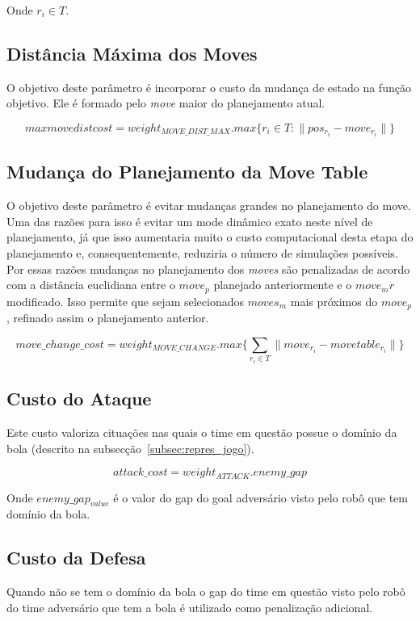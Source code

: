 Onde $r_i \in T$.

\subsection{Distância Máxima dos Moves} 
O objetivo deste parâmetro é incorporar o custo da
mudança de estado na função objetivo. Ele é formado pelo \textit{move}
maior do planejamento atual.

\begin{dmath} 
 max move dist cost = weight_{MOVE{\_}DIST{\_}MAX} . 
 max \lbrace r_i \in T : \lVert pos_{r_i} - move_{r_i}\rVert \rbrace
\end{dmath} 

\subsection{Mudança do Planejamento da Move Table}\label{subsec:change_cost}
O objetivo deste parâmetro é evitar mudanças grandes no
planejamento do move. Uma das razões para isso é evitar um mode dinâmico
exato neste nível de planejamento, já que isso aumentaria muito o custo
computacional desta etapa do planejamento e, consequentemente, reduziria
o número de simulações possíveis. Por essas razões mudanças no planejamento
dos \textit{moves} são penalizadas de acordo com a distância euclidiana
entre o $move_p$ planejado anteriormente e o $move_mr$ modificado.
Isso permite que sejam selecionados $moves_m$ mais próximos do
$move_p$, refinado assim o planejamento anterior.

\begin{dmath} 
 move{\_}change{\_}cost = weight_{MOVE{\_}CHANGE} . 
 max \lbrace \sum_{r_i \in T} \lVert move_{r_i} - move table_{r_i}\rVert \rbrace
\end{dmath} 

\subsection{Custo do Ataque}
Este custo valoriza cituações nas quais o time em questão
possue o domínio da bola (descrito na
subsecção~\ref{subsec:repres_jogo}).

\begin{dmath} 
 attack{\_}cost = weight_{ATTACK} . enemy{\_}gap
\end{dmath} 

Onde $enemy{\_}gap_{value}$ é o valor do gap do goal adversário visto
pelo robô que tem domínio da bola.

\subsection{Custo da Defesa}
Quando não se tem o domínio da bola o gap do time em questão
visto pelo robô do time adversário que tem a bola é utilizado
como penalização adicional.

